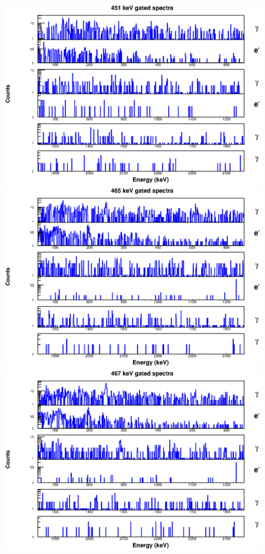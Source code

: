 \includegraphics[scale=0.8]{154Gd_Appendix/451_combined.eps}
\includegraphics[scale=0.8]{154Gd_Appendix/465_combined.eps}
\includegraphics[scale=0.8]{154Gd_Appendix/467_combined.eps}
